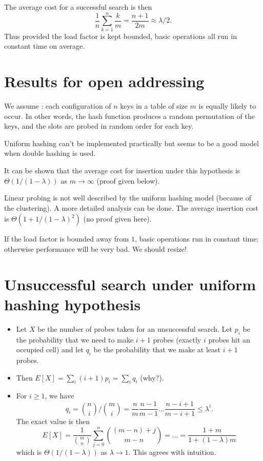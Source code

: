 The average cost for a successful search is then 
$$
\frac{1}{n} \sum_{k=1}^n \frac{k}{m} = \frac{n+1}{2m} \approx \lambda/2 \text{.}
$$
Thus provided the load factor is kept bounded, basic operations all run in 
constant time on average. 

\section{Results for open addressing}
We assume : each configuration of 
$n$ keys in a table of size $m$ is equally likely to occur. In other words, the 
hash function produces a random permutation of the keys, and the slots are 
probed in random order for each key.

Uniform hashing can't be implemented practically but seems to be a good 
model when double hashing is used.

It can be shown that the average cost for insertion under this 
hypothesis is $\Theta(1/(1-\lambda))$ as $m \to \infty$ (proof given below).

Linear probing is not well described by the uniform hashing model 
(because of the clustering). A more detailed analysis can be done. 
The average insertion cost is $\Theta(1 + 1/(1 - \lambda)^2)$ (no proof given here).

If the load factor is bounded away from $1$, basic operations 
run in constant time; otherwise performance will be very bad. We should resize!


\section{Unsuccessful search under uniform hashing hypothesis}
\begin{itemize}
\item Let $X$ be the number of probes taken for an unsuccessful search. 
Let $p_i$ be the probability that we need to make $i+1$ probes 
(exactly $i$ probes hit an occupied cell) and let $q_i$ be the probability 
that we make at least $i+1$ probes. 
\item Then 
$E[X] = \sum_i (i+1) p_i = \sum_i q_i$ (why?).
\item For $i \geq 1$, we have
$$ q_i = \binom{n}{i}/\binom{m}{i} = \frac{n}{m} \frac{n-1}{m-1} 
\dots \frac{n - i + 1}{m - i + 1}  \leq \lambda^i.
$$
The exact value is then
$$
E[X] = \frac{1}{\binom{m}{n}} \sum_{j=0}^n \binom{(m-n)+j}{m-n} = 
\dots = \frac{1+m}{1+(1-\lambda)m}
$$
which is $\Theta(1/(1 - \lambda))$ as $\lambda \to 1$. This agrees with 
intuition.
\end{itemize}

